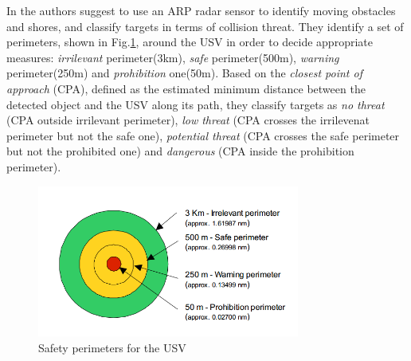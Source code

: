\documentclass[12pt]{article}
\begin{document}
      \indent In \parencite{Almeida2009} the authors suggest to use an ARP radar sensor to identify moving obstacles and shores, and classify targets in terms of collision threat. They identify a set of perimeters, shown in Fig.\ref{fig:perimeters}, around the USV in order to decide appropriate measures: \textit{irrilevant} perimeter(3km), \textit{safe} perimeter(500m), \textit{warning} perimeter(250m) and \textit{prohibition} one(50m). Based on the \textit{closest point of approach} (CPA), defined as the estimated minimum distance between the detected object and the USV along its path, they classify targets as \textit{no threat} (CPA outside irrilevant perimeter), \textit{low threat} (CPA crosses the irrilevenat perimeter but not the safe one), \textit{potential threat} (CPA crosses the safe perimeter but not the prohibited one) and \textit{dangerous} (CPA inside the prohibition perimeter).

      \begin{figure}
            \centering
            \includegraphics[height=5cm]{./Images/Almeida/perimeters}
            \caption{Safety perimeters for the USV}
            \label{fig:perimeters}
      \end{figure}
\end{document}
